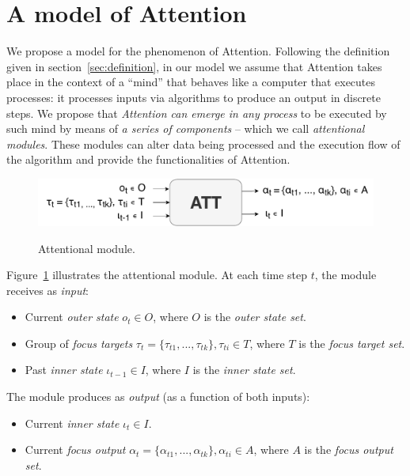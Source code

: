 \documentclass[7pt]{article}
\begin{document}
\section{A model of Attention}
We propose a model for the phenomenon of Attention.
Following the definition given in section~\ref{sec:definition}, in our model we assume that Attention takes place in the context
of a ``mind'' that behaves like a computer that executes processes: it processes inputs via algorithms to produce an output in discrete steps.
We propose that \emph{Attention can emerge in any process} to be executed by such mind by means of \emph{a series of components} -- which we call \emph{attentional modules}. These modules can alter data being processed and the execution flow of the algorithm and provide the functionalities of Attention.

\begin{figure}[H]
    \centering
    \includegraphics[width=0.9\linewidth]{./img/alt_att_block.pdf}
    \label{fig:attmodule}
    \caption{Attentional module.}
\end{figure}

Figure~\ref{fig:attmodule} illustrates the attentional module. At each time step $t$, the module receives as \emph{input}:
\begin{itemize}
    \item Current \emph{outer state} $o_t \in O$, where $O$ is the \emph{outer state set}.
    \item Group of \emph{focus targets} $\tau_t = \{\tau_{t1}, ..., \tau_{tk}\}, \tau_{ti} \in T$,
        where $T$ is the \emph{focus target set}.
    \item Past \emph{inner state} $\iota_{t-1} \in I$, where $I$ is the \emph{inner state set}.
\end{itemize}

The module produces as \emph{output} (as a function of both inputs):
\begin{itemize}
    \item Current \emph{inner state} $\iota_t \in I$.
    \item Current \emph{focus output} $\alpha_t = \{\alpha_{t1}, ..., \alpha_{tk}\}, \alpha_{ti} \in A$,
        where $A$ is the \emph{focus output set}.
\end{itemize}
\end{document}
